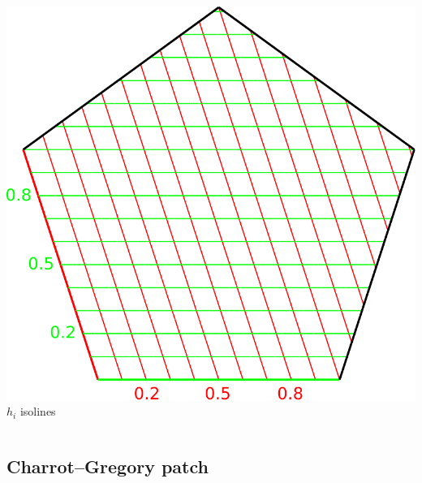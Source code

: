 \documentclass[xcolor=table]{beamer}
\begin{document}
\begin{frame}
\begin{columns}
    \includegraphics[width=.9\textwidth]{images/h-params.pdf}\\
    {\tiny $h_i$ isolines}\\
  \end{columns}
\end{frame}

\subsection{Charrot--Gregory patch}
\end{document}
